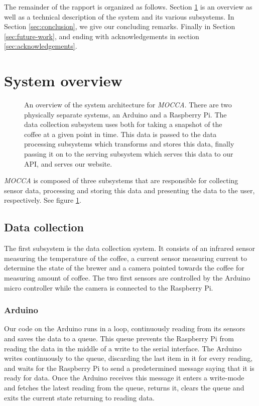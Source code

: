 \documentclass[12pt,a4paper,oneside,article]{memoir}
\numberwithin{equation}{chapter}
\begin{document}
The remainder of the rapport is organized as follows. Section 
\ref{sec:system-overview} is an overview as well as a technical
description of the system and its various subsystems. In Section
\ref{sec:conclusion}, we give our concluding remarks. Finally in Section 
\ref{sec:future-work}, and ending with acknowledgements in section 
\ref{sec:acknowledgements}.

\section{System overview}\label{sec:system-overview}
\begin{figure}[h]
  \centerfloat{}
  \scalebox{.75}{}
  \caption{An overview of the system architecture for \textit{MOCCA}. There are
    two physically separate systems, an Arduino and a Raspberry Pi. The data
    collection subsystem uses both for taking a snapshot of the coffee at a
    given point in time. This data is passed to the data processing subsystems
    which transforms and stores this data, finally passing it on to the serving
    subsystem which serves this data to our API, and serves our website.
  }\label{fig:architecture}
\end{figure}
\textit{MOCCA} is composed of three subsystems that are responsible for
collecting sensor data, processing and storing this data and presenting the data
to the user, respectively. See figure \ref{fig:architecture}.

\subsection{Data collection}\label{sec:data-collection}
The first subsystem is the data collection system. It consists of an 
infrared sensor measuring the temperature of the coffee, a current sensor 
measuring current to determine the state of the brewer and a camera pointed 
towards the coffee for measuring amount of coffee. The two first sensors are 
controlled by the Arduino micro controller while the camera is connected to the 
Raspberry Pi.

\subsubsection{Arduino}\label{sec:arduino}
Our code on the Arduino runs in a loop, continuously reading from its sensors 
and saves the data to a queue. This queue prevents the Raspberry Pi from 
reading the data in the middle of a write to the serial interface. The Arduino 
writes continuously to the queue, discarding the last item in it for every 
reading, and waits for the Raspberry Pi to send a predetermined message saying 
that it is ready for data. Once the Arduino receives this message it enters a 
write-mode and fetches the latest reading from the queue, returns it, clears the 
queue and exits the current state returning to reading data. 
\end{document}
